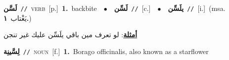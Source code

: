 \documentclass[10pt,a4paper,twoside]{article} %
\begin{document}
\begin{multicols}{2}
{\setlength\topsep{0pt}\textbf{\foreignlanguage{arabic}{لَسَّن}}\ {\color{gray}\texttt{//}\color{black}}\ \textsc{verb}\ [p.]\ \textbf{1.}~backbite\ \ $\bullet$\ \ \setlength\topsep{0pt}\textbf{\foreignlanguage{arabic}{لَسِّن}}\ {\color{gray}\texttt{//}\color{black}}\ [c.]\ \ $\bullet$\ \ \setlength\topsep{0pt}\textbf{\foreignlanguage{arabic}{يلَسِّن}}\ {\color{gray}\texttt{//}\color{black}}\ [i.]\ \color{gray}(msa. \foreignlanguage{arabic}{يَغْتاب}~\foreignlanguage{arabic}{\textbf{١.}})\color{black}\  \begin{flushright}\color{gray}\foreignlanguage{arabic}{\textbf{\underline{\foreignlanguage{arabic}{أمثلة}}}: لو تعرف مين باقي يلَسِّن عليك غير تنجن}\end{flushright}\color{black}} \vspace{2mm}

{\setlength\topsep{0pt}\textbf{\foreignlanguage{arabic}{لِسَّينِة}}\ {\color{gray}\texttt{//}\color{black}}\ \textsc{noun}\ [f.]\ \textbf{1.}~Borago officinalis, also known as a starflower\ } \vspace{2mm}


\end{multicols}
\end{document}

